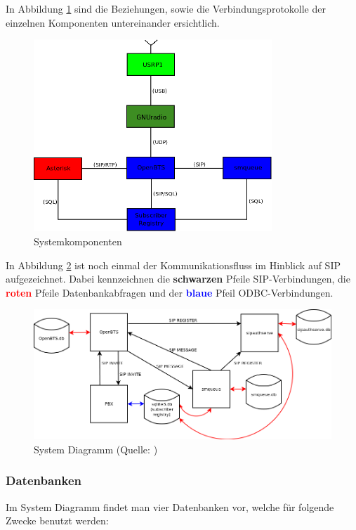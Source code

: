 In Abbildung \ref{fig:openbts_comp} sind die Beziehungen, sowie die Verbindungsprotokolle der einzelnen Komponenten untereinander ersichtlich.
\newpage
\begin{figure}[htbp]
	\centering
		\includegraphics[width=0.80\textwidth]{img/openbts_comp.png}
	\caption{Systemkomponenten}
	\label{fig:openbts_comp}
\end{figure}


In Abbildung \ref{fig:openbts_system_diagram} ist noch einmal der Kommunikationsfluss im Hinblick auf SIP aufgezeichnet. Dabei kennzeichnen die \textbf{schwarzen} Pfeile SIP-Verbindungen, die \textcolor{red}{\textbf{roten}} Pfeile Datenbankabfragen und der \textcolor{blue}{\textbf{blaue}} Pfeil ODBC-Verbindungen.

\begin{figure}[hbtp]
	\centering
		\includegraphics[width=1.00\textwidth]{img/openbts_system_diagram.png}
	\caption{System Diagramm (Quelle: \cite{bib:diagramm:openbts})}
	\label{fig:openbts_system_diagram}
\end{figure}
\subsubsection{Datenbanken}
Im System Diagramm findet man vier Datenbanken vor, welche für folgende Zwecke benutzt werden:

